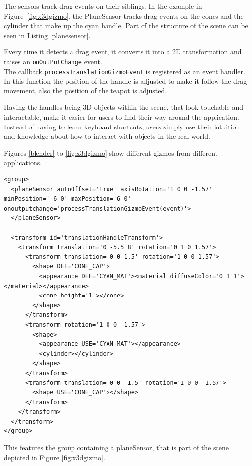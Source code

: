 The sensors track drag events on their siblings. In the example in
Figure~\ref{fig:x3dgizmo}, the
PlaneSensor tracks drag events on the cones and the cylinder that make up the
cyan handle. Part of the structure of the scene can be seen in Listing
\ref{planesensor}.

Every time it detects a drag event, it converts it into a 2D
transformation and raises an \texttt{onOutPutChange} event.\\
The callback \texttt{processTranslationGizmoEvent} is registered as an event handler.
In this function the position of the handle is adjusted to make it
follow the drag movement, also the position of the teapot is adjusted.

Having the handles being \gls{3D} objects within the scene, that look
touchable and interactable, make it easier for users to find their way
around the application. Instead of having to learn keyboard shortcuts,
users simply use their intuition and knowledge about how to interact with
objects in the real world.

Figures \ref{blender} to \ref{fig:x3dgizmo} show different gizmos from
different applications.

\begin{listing}
  \begin{verbatim}
<group>
  <planeSensor autoOffset='true' axisRotation='1 0 0 -1.57' minPosition='-6 0' maxPosition='6 0' onoutputchange='processTranslationGizmoEvent(event)'>
  </planeSensor>

  <transform id='translationHandleTransform'>
    <transform translation='0 -5.5 8' rotation='0 1 0 1.57'>
      <transform translation='0 0 1.5' rotation='1 0 0 1.57'>
        <shape DEF='CONE_CAP'>
          <appearance DEF='CYAN_MAT'><material diffuseColor='0 1 1'></material></appearance>
          <cone height='1'></cone>
        </shape>
      </transform>
      <transform rotation='1 0 0 -1.57'>
        <shape>
          <appearance USE='CYAN_MAT'></appearance>
          <cylinder></cylinder>
        </shape>
      </transform>
      <transform translation='0 0 -1.5' rotation='1 0 0 -1.57'>
        <shape USE='CONE_CAP'></shape>
      </transform>
    </transform>
  </transform>
</group>
  \end{verbatim}
  \caption{This features the group containing a planeSensor, that is part of the scene depicted in Figure \ref{fig:x3dgizmo}.}
  \label{planesensor}
\end{listing}

